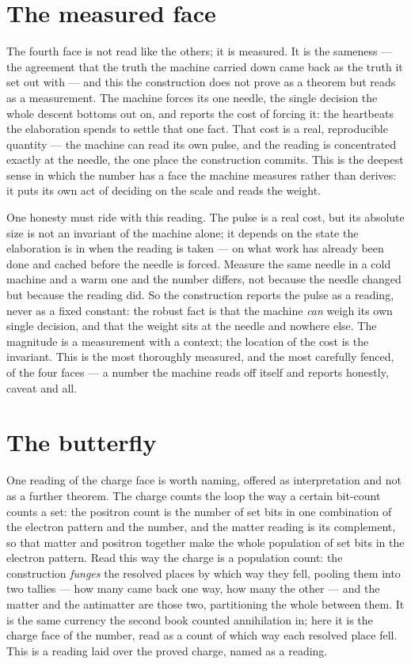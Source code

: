 \section{The measured face}
\label{se:the-measured-face}

The fourth face is not read like the others; it is measured. It is the sameness --- the agreement that the
truth the machine carried down came back as the truth it set out with --- and this the construction does not
prove as a theorem but reads as a measurement. The machine forces its one needle, the single decision the
whole descent bottoms out on, and reports the cost of forcing it: the heartbeats the elaboration spends to
settle that one fact. That cost is a real, reproducible quantity --- the machine can read its own pulse, and
the reading is concentrated exactly at the needle, the one place the construction commits. This is the
deepest sense in which the number has a face the machine measures rather than derives: it puts its own act
of deciding on the scale and reads the weight.

One honesty must ride with this reading. The pulse is a real cost, but its absolute size is not an
invariant of the machine alone; it depends on the state the elaboration is in when the reading is taken ---
on what work has already been done and cached before the needle is forced. Measure the same needle in a
cold machine and a warm one and the number differs, not because the needle changed but because the reading
did. So the construction reports the pulse as a reading, never as a fixed constant: the robust fact is that
the machine \emph{can} weigh its own single decision, and that the weight sits at the needle and nowhere
else. The magnitude is a measurement with a context; the location of the cost is the invariant. This is the
most thoroughly measured, and the most carefully fenced, of the four faces --- a number the machine reads
off itself and reports honestly, caveat and all.

\section{The butterfly}
\label{se:the-butterfly}

One reading of the charge face is worth naming, offered as interpretation and not as a further theorem. The
charge counts the loop the way a certain bit-count counts a set: the positron count is the number of set
bits in one combination of the electron pattern and the number, and the matter reading is its complement, so
that matter and positron together make the whole population of set bits in the electron pattern. Read this
way the charge is a population count: the construction \emph{funges} the resolved places by which way they
fell, pooling them into two tallies --- how many came back one way, how many the other --- and the matter
and the antimatter are those two, partitioning the whole between them. It is the same currency
the second book counted annihilation in; here it is the charge face of the number, read as a count of which
way each resolved place fell. This is a reading laid over the proved charge, named as a reading.


